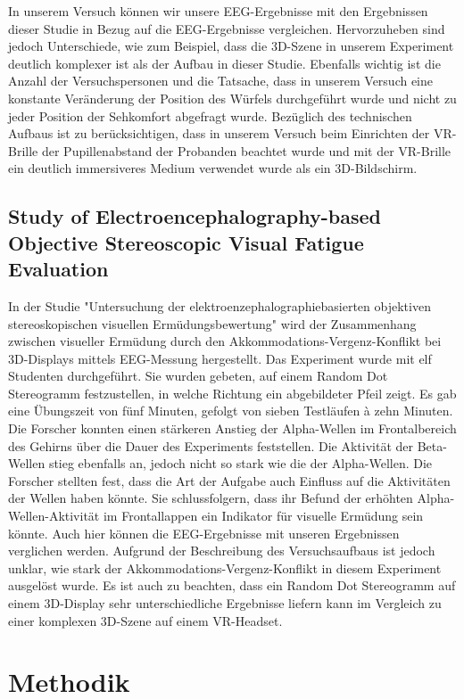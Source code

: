 \documentclass[conference]{IEEEtran}
\begin{document}
In unserem Versuch können wir unsere EEG-Ergebnisse mit den Ergebnissen dieser Studie in Bezug auf die EEG-Ergebnisse vergleichen. Hervorzuheben sind jedoch Unterschiede, wie zum Beispiel, dass die 3D-Szene in unserem Experiment deutlich komplexer ist als der Aufbau in dieser Studie. Ebenfalls wichtig ist die Anzahl der Versuchspersonen und die Tatsache, dass in unserem Versuch eine konstante Veränderung der Position des Würfels durchgeführt wurde und nicht zu jeder Position der Sehkomfort abgefragt wurde. Bezüglich des technischen Aufbaus ist zu berücksichtigen, dass in unserem Versuch beim Einrichten der VR-Brille der Pupillenabstand der Probanden beachtet wurde und mit der VR-Brille ein deutlich immersiveres Medium verwendet wurde als ein 3D-Bildschirm.


\subsection{Study of Electroencephalography-based Objective Stereoscopic Visual Fatigue Evaluation}
In der Studie "\textnormal{Untersuchung} der elektroenzephalographiebasierten objektiven stereoskopischen visuellen Ermüdungsbewertung" \cite{b5} wird der Zusammenhang zwischen visueller Ermüdung durch den Akkommodations-Vergenz-Konflikt bei 3D-Displays mittels EEG-Messung hergestellt.
Das Experiment wurde mit elf Studenten durchgeführt. Sie wurden gebeten, auf einem Random Dot Stereogramm festzustellen, in welche Richtung ein abgebildeter Pfeil zeigt. Es gab eine Übungszeit von fünf Minuten, gefolgt von sieben Testläufen à zehn Minuten.
Die Forscher konnten einen stärkeren Anstieg der Alpha-Wellen im Frontalbereich des Gehirns über die Dauer des Experiments feststellen. Die Aktivität der Beta-Wellen stieg ebenfalls an, jedoch nicht so stark wie die der Alpha-Wellen. Die Forscher stellten fest, dass die Art der Aufgabe auch Einfluss auf die Aktivitäten der Wellen haben könnte. Sie schlussfolgern, dass ihr Befund der erhöhten Alpha-Wellen-Aktivität im Frontallappen ein Indikator für visuelle Ermüdung sein könnte.
Auch hier können die EEG-Ergebnisse mit unseren Ergebnissen verglichen werden. Aufgrund der Beschreibung des Versuchsaufbaus ist jedoch unklar, wie stark der Akkommodations-Vergenz-Konflikt in diesem Experiment ausgelöst wurde. Es ist auch zu beachten, dass ein Random Dot Stereogramm auf einem 3D-Display sehr unterschiedliche Ergebnisse liefern kann im Vergleich zu einer komplexen 3D-Szene auf einem VR-Headset.
 

\section{Methodik}
\end{document}
